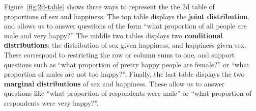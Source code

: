 \documentclass[journal]{vgtc}
\begin{document}
Figure~\ref{fig:2d-table} shows three ways to represent the the 2d table of proportions of sex and happiness. The top table displays the {\bf joint distribution}, and allows us to answer questions of the form ``what proportion of all people are male and very happy?'' The middle two tables displays two {\bf conditional distributions}: the distribution of sex given happiness, and happiness given sex. These correspond to restricting the row or column sums to one, and support questions such as ``what proportion of pretty happy people are female?'' or ``what proportion of males are not too happy?''. Finally, the last table displays the two {\bf marginal distributions} of sex and happiness. These allow us to answer questions like ``what proportion of respondents were male'' or ``what proportion of respondents were very happy?''.
\end{document}
